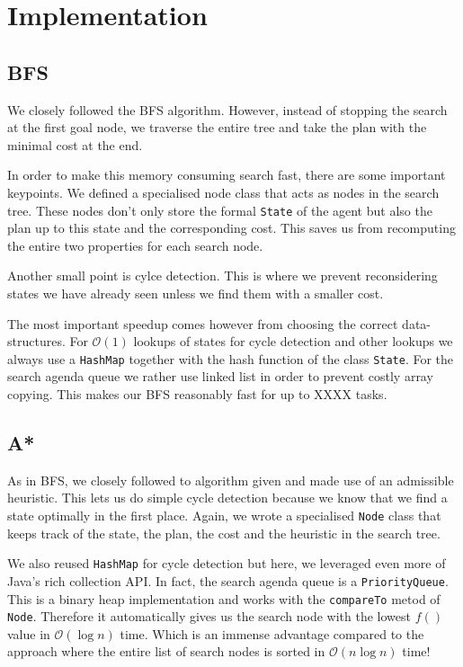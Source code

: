 \documentclass[11pt]{article}
\begin{document}
\section{Implementation}

\subsection{BFS}
We closely followed the BFS algorithm. However, instead of stopping the 
search at the first goal node, we traverse the entire tree and take the plan 
with the minimal cost at the end. 

In order to make this memory consuming search fast, there are some 
important keypoints. We defined a specialised node class that acts as nodes in 
the search tree. These nodes don't only store the formal \texttt{State} of the 
agent but also the plan up to this state and the corresponding cost. This 
saves us from recomputing the entire two properties for each search node.

Another small point is cylce detection. This is where we prevent reconsidering 
states we have already seen unless we find them with a smaller cost.

The most important speedup comes however from choosing the correct data-structures.
For $\mathcal{O}(1)$ lookups of states for cycle detection and other lookups we 
always use a \texttt{HashMap} together with the hash function of the class 
\texttt{State}.
For the search agenda queue we rather use linked list in order to prevent costly 
array copying. This makes our BFS reasonably fast for up to XXXX tasks.

\subsection{A*}
As in BFS, we closely followed to algorithm given and made use of an admissible 
heuristic. This lets us do simple cycle detection because we know that we find a 
state optimally in the first place. Again, we wrote a specialised \texttt{Node} 
class that keeps track of the state, the plan, the cost and the heuristic in the 
search tree.

We also reused \texttt{HashMap} for cycle detection but here,
 we leveraged even more of Java's rich collection API. In fact, the search 
agenda queue is a \texttt{PriorityQueue}. This is a binary heap implementation 
and works with the \texttt{compareTo} metod of \texttt{Node}. Therefore it automatically 
gives us the search node with the lowest $f()$ value in $\mathcal{O}(\log n)$ 
time. Which is an immense advantage compared to the approach where the entire 
list of search nodes is sorted in $\mathcal{O}(n \log n)$ time!
\end{document}
